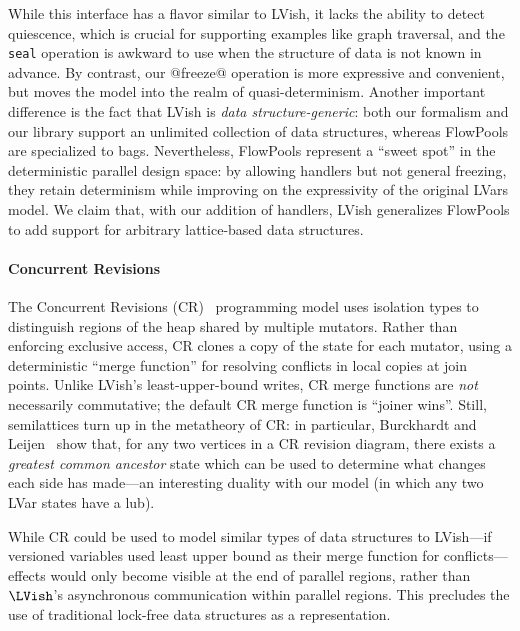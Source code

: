 While
this interface has a flavor similar to LVish, it lacks the ability to
detect quiescence, which is crucial for supporting examples like graph
traversal, and the {\tt seal} operation is awkward to use when the structure of
data is not known in advance.  By contrast, our @freeze@ operation
is more expressive and convenient, but moves the
model into the realm of quasi-determinism.  Another important difference is the
fact that LVish is \emph{data structure-generic}: both our formalism and our library
support an unlimited collection of data structures, whereas FlowPools 
are specialized to bags.
Nevertheless, FlowPools represent a ``sweet spot'' in the deterministic parallel design space: by
allowing handlers but not general freezing, they retain determinism
while improving on the expressivity of the original LVars model.  We
claim that, with our addition of handlers, LVish generalizes FlowPools
to add support for arbitrary lattice-based data structures.

\paragraph{Concurrent Revisions}

The Concurrent Revisions (CR)~\cite{concurrent-revisions-haskell11} programming model
 uses isolation types to distinguish regions of the heap shared
by multiple mutators.  Rather than enforcing exclusive access, CR
clones a copy of the state for each mutator, using a
deterministic ``merge function'' for resolving conflicts in local copies at join points.
Unlike LVish's least-upper-bound writes, CR merge functions are \emph{not} necessarily
commutative; the default CR merge function is ``joiner wins''.
Still, semilattices turn up in the metatheory of CR: in particular,
Burckhardt and Leijen~\cite{semantics-concurrent-revisions} show that,
for any two vertices in a CR revision diagram, there exists a
\emph{greatest common ancestor} state which can be used to determine
what changes each side has made---an interesting duality with our
model (in which any two LVar states have a lub).

While CR could be used to model similar types of data structures to LVish---if
versioned variables used least upper bound as their merge function for
conflicts---effects would only become visible at the end of parallel regions,
rather than $\LVish$'s asynchronous communication within parallel regions.  This
precludes the use of traditional lock-free data structures as a representation.

